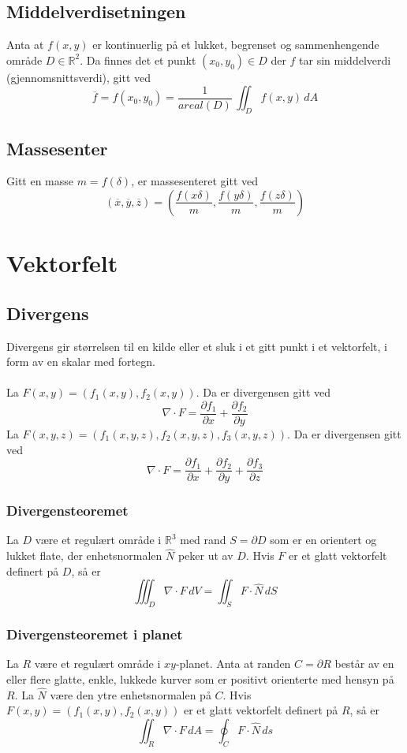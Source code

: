 \documentclass{article}
\begin{document}
\subsection{Middelverdisetningen}
Anta at $f(x, y)$ er kontinuerlig på et lukket, begrenset og sammenhengende område $D \in \mathbb{R}^2$. Da finnes det et punkt $(x_0, y_0) \in D$ der $f$ tar sin middelverdi (gjennomsnittsverdi), gitt ved
\[\overline{f} = f(x_0, y_0) = \frac{1}{areal(D)}\,\iint_D f(x, y)\,dA\]


\subsection{Massesenter}
Gitt en masse $m = f(\delta)$, er massesenteret gitt ved
\[(\overline{x}, \overline{y}, \overline{z}) = \left( \frac{f(x\delta)}{m}, \frac{f(y\delta)}{m}, \frac{f(z\delta)}{m} \right)\]


\clearpage




\section{Vektorfelt}


\subsection{Divergens}
Divergens gir størrelsen til en kilde eller et sluk i et gitt punkt i et vektorfelt, i form av en skalar med fortegn.\\\\
La $F(x, y) = \left(f_1(x, y), f_2(x, y)\right)$. Da er divergensen gitt ved
\[\nabla \cdot F = \frac{\partial f_1}{\partial x} + \frac{\partial f_2}{\partial y}\]
La $F(x, y, z) = \left(f_1(x, y, z), f_2(x, y, z), f_3(x, y, z)\right)$. Da er divergensen gitt ved
\[\nabla \cdot F = \frac{\partial f_1}{\partial x} + \frac{\partial f_2}{\partial y} + \frac{\partial f_3}{\partial z}\]

\subsubsection{Divergensteoremet} \label{Divergensteoremet}
La $D$ være et regulært område i $\mathbb{R}^3$ med rand $S = \partial D$ som er en orientert og lukket flate, der enhetsnormalen $\hat{N}$ peker ut av $D$. Hvis $F$ er et glatt vektorfelt definert på $D$, så er
\[\iiint_D \nabla \cdot F\,dV = \iint_S F \cdot \hat{N}\,dS\]

\subsubsection{Divergensteoremet i planet}
La $R$ være et regulært område i $xy$-planet. Anta at randen $C = \partial R$ består av en eller flere glatte, enkle, lukkede kurver som er positivt orienterte med hensyn på $R$. La $\hat{N}$ være den ytre enhetsnormalen på $C$. Hvis $F(x, y)=(f_1(x, y), f_2(x, y))$ er et glatt vektorfelt definert på $R$, så er
\[\iint_R \nabla \cdot F\,dA = \oint_C F \cdot \hat{N}\,ds\]
\end{document}
